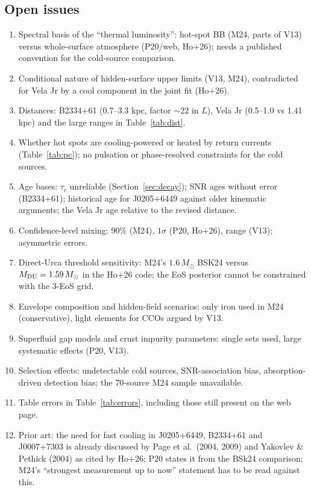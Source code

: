 \documentclass[11pt,a4paper]{article}
\begin{document}
\subsection{Open issues}
\begin{enumerate}[leftmargin=1.5em,itemsep=0pt]
\item Spectral basis of the ``thermal luminosity'': hot-spot BB (M24, parts of V13) versus whole-surface atmosphere (P20/web, Ho+26); needs a published convention for the cold-source comparison.
\item Conditional nature of hidden-surface upper limits (V13, M24), contradicted for Vela Jr by a cool component in the joint fit (Ho+26).
\item Distances: B2334+61 (0.7--3.3 kpc, factor $\sim22$ in $L$), Vela Jr (0.5--1.0 vs 1.41 kpc) and the large ranges in Table~\ref{tab:dist}.
\item Whether hot spots are cooling-powered or heated by return currents (Table~\ref{tab:pc}); no pulsation or phase-resolved constraints for the cold sources.
\item Age bases: $\tau_c$ unreliable (Section~\ref{sec:decay}); SNR ages without error (B2334+61); historical age for J0205+6449 against older kinematic arguments; the Vela Jr age relative to the revised distance.
\item Confidence-level mixing: 90\% (M24), $1\sigma$ (P20, Ho+26), range (V13); asymmetric errors.
\item Direct-Urca threshold sensitivity: M24's $1.6\,M_\odot$ BSK24 versus $M_{\rm DU}=1.59\,M_\odot$ in the Ho+26 code; the EoS posterior cannot be constrained with the 3-EoS grid.
\item Envelope composition and hidden-field scenarios: only iron used in M24 (conservative), light elements for CCOs argued by V13.
\item Superfluid gap models and crust impurity parameters: single sets used, large systematic effects (P20, V13).
\item Selection effects: undetectable cold sources, SNR-association bias, absorption-driven detection bias; the 70-source M24 sample unavailable.
\item Table errors in Table~\ref{tab:errors}, including those still present on the web page.
\item Prior art: the need for fast cooling in J0205+6449, B2334+61 and J0007+7303 is already discussed by Page et al.\ (2004, 2009) and Yakovlev \& Pethick (2004) as cited by Ho+26; P20 states it from the BSk24 comparison; M24's ``strongest measurement up to now'' statement has to be read against this.
\end{enumerate}
\end{document}
